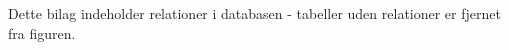 \label{bil:db_relationer}

Dette bilag indeholder relationer i databasen - tabeller uden relationer er fjernet fra figuren.

